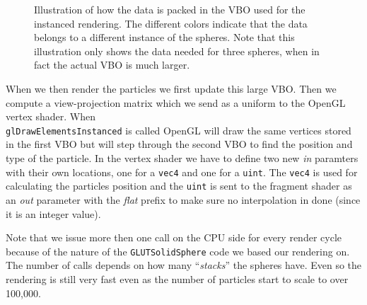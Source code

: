 \documentclass[a4paper]{article}
\begin{document}
\begin{figure}[h]
\centering


\caption{Illustration of how the data is packed in the VBO used for the instanced rendering. 
The different colors indicate that the data belongs to a different instance of the spheres. 
Note that this illustration only shows the data needed for three spheres, when in fact the actual VBO is much larger.}
\label{instanced_figure}

\end{figure}

When we then render the particles we first update this large VBO. 
Then we compute a view-projection matrix which we send as a uniform to the OpenGL vertex shader. 
When\\ \verb|glDrawElementsInstanced| is called OpenGL will draw the same vertices stored in the first VBO but will step through the second VBO to find the position and type of the particle. 
In the vertex shader we have to define two new \emph{in} paramters with their own locations, one for a \verb|vec4| and one for a \verb|uint|. 
The \verb|vec4| is used for calculating the particles position and the \verb|uint| is sent to the fragment shader as an \emph{out} parameter with the \emph{flat} prefix to make sure no interpolation in done (since it is an integer value).   

Note that we issue more then one call on the CPU side for every render cycle because of the nature of the \verb|GLUTSolidSphere| code we based our rendering on.
The number of calls depends on how many ``\emph{stacks}'' the spheres have.
Even so the rendering is still very fast even as the number of particles start to scale to over 100,000. 
\end{document}

